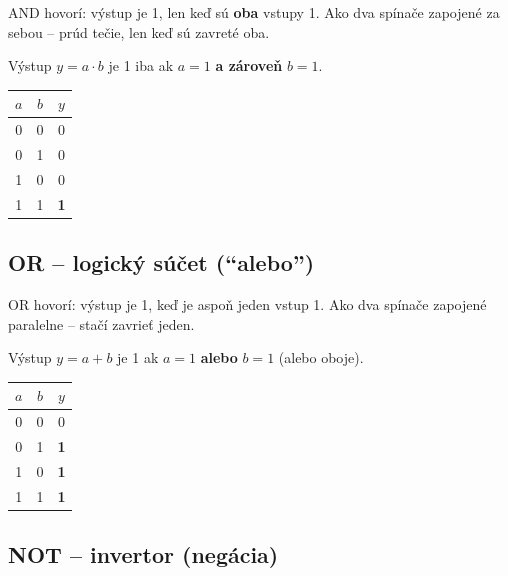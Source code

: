 AND hovorí: výstup je 1, len keď sú \textbf{oba} vstupy 1. Ako dva spínače zapojené za sebou -- prúd tečie, len keď sú zavreté oba.

\begin{minipage}{0.52\textwidth}
Výstup $y = a \cdot b$ je 1 iba ak $a=1$ \textbf{a zároveň} $b=1$.
\end{minipage}
\hfill
\begin{minipage}{0.44\textwidth}
\begin{center}
\begin{tabular}{cc|c}
\toprule
$a$ & $b$ & $y$ \\
\midrule
0 & 0 & 0 \\
0 & 1 & 0 \\
1 & 0 & 0 \\
1 & 1 & \textbf{1} \\
\bottomrule
\end{tabular}
\end{center}
\end{minipage}

\subsection{OR -- logický súčet (``alebo'')}

OR hovorí: výstup je 1, keď je aspoň jeden vstup 1. Ako dva spínače zapojené paralelne -- stačí zavrieť jeden.

\begin{minipage}{0.52\textwidth}
Výstup $y = a + b$ je 1 ak $a=1$ \textbf{alebo} $b=1$ (alebo oboje).
\end{minipage}
\hfill
\begin{minipage}{0.44\textwidth}
\begin{center}
\begin{tabular}{cc|c}
\toprule
$a$ & $b$ & $y$ \\
\midrule
0 & 0 & 0 \\
0 & 1 & \textbf{1} \\
1 & 0 & \textbf{1} \\
1 & 1 & \textbf{1} \\
\bottomrule
\end{tabular}
\end{center}
\end{minipage}

\subsection{NOT -- invertor (negácia)}


